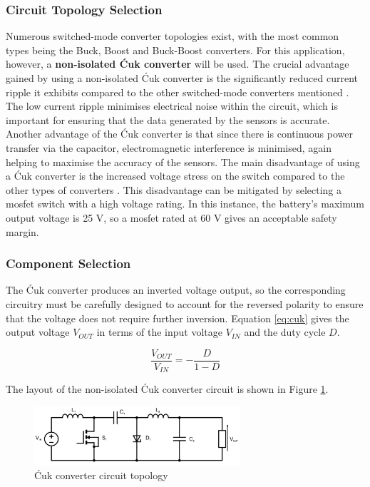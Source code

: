 \subsubsection{Circuit Topology Selection}

Numerous switched-mode converter topologies exist, with the most common types being the Buck, Boost and Buck-Boost converters. For this application, however, a \textbf{non-isolated Ćuk converter} will be used. The crucial advantage gained by using a non-isolated Ćuk converter is the significantly reduced current ripple it exhibits compared to the other switched-mode converters mentioned \cite{cuk1981dc-to-dc}. The low current ripple minimises electrical noise within the circuit, which is important for ensuring that the data generated by the sensors is accurate. Another advantage of the Ćuk converter is that since there is continuous power transfer via the capacitor, electromagnetic interference is minimised, again helping to maximise the accuracy of the sensors. The main disadvantage of using a Ćuk converter is the increased voltage stress on the switch compared to the other types of converters \cite{Bailey:1641409}. This disadvantage can be mitigated by selecting a \gls{mosfet} switch with a high voltage rating. In this instance, the battery's maximum output voltage is 25 V, so a \gls{mosfet} rated at 60 V gives an acceptable safety margin.

\subsubsection{Component Selection}

The Ćuk converter produces an inverted voltage output, so the corresponding circuitry must be carefully designed to account for the reversed polarity to ensure that the voltage does not require further inversion. Equation \ref{eq:cuk} gives the output voltage $V_{OUT}$ in terms of the input voltage $V_{IN}$ and the duty cycle $D$.

\begin{equation}
  \frac{V_{OUT}}{V_{IN}} = - \frac{D}{1-D}
  \label{eq:cuk}
\end{equation}

The layout of the non-isolated Ćuk converter circuit is shown in Figure \ref{fig:cukdiagram}.

\begin{figure}[H]
  \centering
  \includegraphics[width=0.68\textwidth]{figs/Samuel/Figures/cuk mosfet labelled (1).pdf}
  \caption{Ćuk converter circuit topology}
  \label{fig:cukdiagram}
\end{figure}



